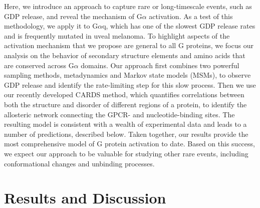 \documentclass[../main.tex]{subfiles}
\begin{document}
        Here, we introduce an approach to capture rare or long-timescale events, such as GDP release, and reveal the mechanism of G$\alpha$ activation. As a test of this methodology, we apply it to G$\alpha$q, which has one of the slowest GDP release rates\cite{Chidiac:1999jh} and is frequently mutated in uveal melanoma\cite{VanRaamsdonk:2009kv,VanRaamsdonk:2010iy}. To highlight aspects of the activation mechanism that we propose are general to all G proteins, we focus our analysis on the behavior of secondary structure elements and amino acids that are conserved across G$\alpha$ domains. Our approach first combines two powerful sampling methods, metadynamics\cite{Laio:2002ft} and Markov state models (MSMs)\cite{Bowman:2013uj}, to observe GDP release and identify the rate-limiting step for this slow process. Then we use our recently developed CARDS method\cite{Singh:2017hh}, which quantifies correlations between both the structure and disorder of different regions of a protein, to identify the allosteric network connecting the GPCR- and nucleotide-binding sites. The resulting model is consistent with a wealth of experimental data and leads to a number of predictions, described below. Taken together, our results provide the most comprehensive model of G protein activation to date. Based on this success, we expect our approach to be valuable for studying other rare events, including conformational changes and unbinding processes. 

	
    \section{Results and Discussion}
\end{document}
